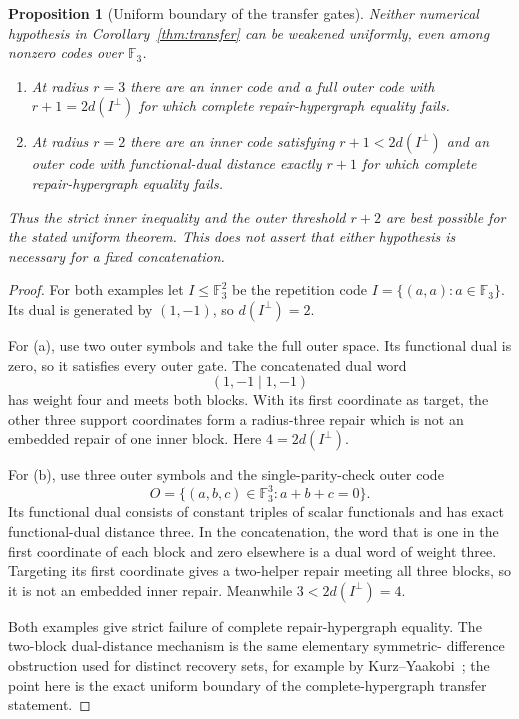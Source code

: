\documentclass[11pt]{article}
\newtheorem{proposition}[theorem]{Proposition}
\theoremstyle{definition}
\theoremstyle{remark}
\newcommand{\F}{\mathbb{F}}
\begin{document}
\begin{proposition}[Uniform boundary of the transfer gates]
\label{prop:transfer-boundary}
Neither numerical hypothesis in Corollary~\ref{thm:transfer} can be weakened
uniformly, even among nonzero codes over $\F_3$.
\begin{enumerate}[label=(\alph*),leftmargin=2.1em]
\item At radius $r=3$ there are an inner code and a full outer code with
      $r+1=2d(I^\perp)$ for which complete repair-hypergraph equality fails.
\item At radius $r=2$ there are an inner code satisfying
      $r+1<2d(I^\perp)$ and an outer code with functional-dual distance
      exactly $r+1$ for which complete repair-hypergraph equality fails.
\end{enumerate}
Thus the strict inner inequality and the outer threshold $r+2$ are best
possible for the stated uniform theorem.  This does not assert that either
hypothesis is necessary for a fixed concatenation.
\end{proposition}

\begin{proof}
For both examples let $I\leq\F_3^2$ be the repetition code
$I=\{(a,a):a\in\F_3\}$.  Its dual is generated by $(1,-1)$, so
$d(I^\perp)=2$.

For (a), use two outer symbols and take the full outer space.  Its functional
dual is zero, so it satisfies every outer gate.  The concatenated dual word
\[
 (1,-1\mid 1,-1)
\]
has weight four and meets both blocks.  With its first coordinate as target,
the other three support coordinates form a radius-three repair which is not
an embedded repair of one inner block.  Here $4=2d(I^\perp)$.

For (b), use three outer symbols and the single-parity-check outer code
\[
 O=\{(a,b,c)\in\F_3^3:a+b+c=0\}.
\]
Its functional dual consists of constant triples of scalar functionals and
has exact functional-dual distance three.  In the concatenation, the word
that is one in the first coordinate of each block and zero elsewhere is a
dual word of weight three.  Targeting its first coordinate gives a
two-helper repair meeting all three blocks, so it is not an embedded inner
repair.  Meanwhile $3<2d(I^\perp)=4$.

Both examples give strict failure of complete repair-hypergraph equality.
The two-block dual-distance mechanism is the same elementary symmetric-
difference obstruction used for distinct recovery sets, for example by
Kurz--Yaakobi~\cite[Lemma~10(a)]{KurzYaakobi2021}; the point here is the exact
uniform boundary of the complete-hypergraph transfer statement.
\end{proof}
\end{document}

